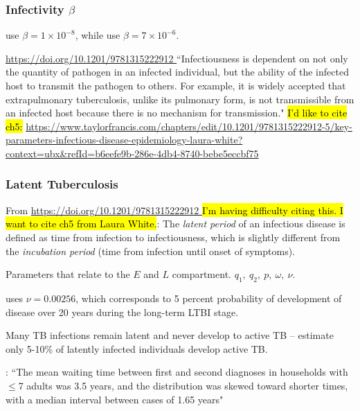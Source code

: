 \documentclass[sn-mathphys,Numbered]{sn-jnl}%
\theoremstyle{thmstyleone}%
\theoremstyle{thmstyletwo}%
\theoremstyle{thmstylethree}%
\begin{document}
\subsubsection{Infectivity $\beta$}

 \cite{Guo2011PersistentLatency} use $\beta=1\times 10^{-8}$, while \cite{Ziv2001EarlyInfection} use $\beta=7\times 10^{-6}$.

\url{https://doi.org/10.1201/9781315222912 } ``Infectiousness is dependent on not only the quantity of pathogen in an infected individual, but the ability of the infected host to transmit the pathogen to others.  For example, it is widely accepted that extrapulmonary tuberculosis, unlike its pulmonary form, is not transmissible from an infected host because there is no mechanism for transmission."  \hl{I'd like to cite ch5:} \url{https://www.taylorfrancis.com/chapters/edit/10.1201/9781315222912-5/key-parameters-infectious-disease-epidemiology-laura-white?context=ubx&refId=b6eefe9b-286e-4db4-8740-bebe5eccbf75}

\subsubsection{Latent Tuberculosis}

From \url{https://doi.org/10.1201/9781315222912 } \hl{I'm having difficulty citing this.  I want to cite ch5 from Laura White.}:  The \textit{latent period} of an infectious disease is defined as time from infection to infectiousness, which is slightly different from the \textit{incubation period} (time from infection until onset of symptoms).


Parameters that relate to the $E$ and $L$ compartment.  $q_1,~q_2,~p,~\omega,~\nu$.  



\cite{Ziv2001EarlyInfection} uses $\nu = 0.00256$, which corresponds to 5 percent probability of development of disease over 20 years during the long-term LTBI stage.  




Many TB infections remain latent and never develop to active TB -- \cite{Khajanchi2018DynamicsReactivation} estimate only 5-10\% of latently infected individuals develop active TB.  

\cite{Brooks-Pollock2011}: ``The mean waiting time between first and second diagnoses in households with $\leq$7 adults was 3.5 years, and the distribution was skewed toward shorter times, with a median interval between cases of 1.65 years" 
\end{document}
